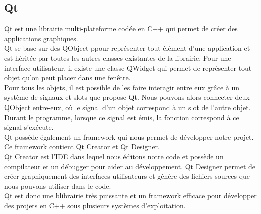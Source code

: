 \subsection{Qt}

Qt est une librairie multi-plateforme codée en C++ qui permet de créer des applications graphiques. \\

Qt se base sur des QObject ppour représenter tout élément d'une application et est héritée par toutes les autres classes existantes de la librairie. Pour une interface utilisateur, il existe une classe QWidget qui permet de représenter tout objet qu'on peut placer dans une fenêtre.\\

Pour tous les objets, il est possible de les faire interagir entre eux grâce à un système de signaux et slots que propose Qt. Nous pouvons alors connecter deux QObject entre-eux, où le signal d'un objet correspond à un slot de l'autre objet. Durant le programme, lorsque ce signal est émis, la fonction correspond à ce signal s'exécute. \\

Qt possède également un framework qui nous permet de développer notre projet. Ce framework contient Qt Creator et Qt Designer. \\

Qt Creator est l'IDE dans lequel nous éditons notre code et possède un compilateur et un débugger pour aider au développement. Qt Designer permet de créer graphiquement des interfaces utilisateurs et génère des fichiers sources que nous pouvons utiliser dans le code. \\

Qt est donc une blibrairie très puissante et un framework efficace pour développer des projets en C++ sous plusieurs systèmes d'exploitation.